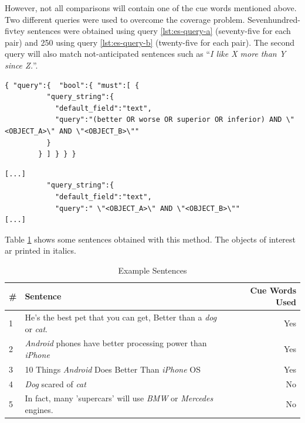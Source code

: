 However, not all comparisons will contain one of the cue words mentioned above. Two different queries were used to overcome the coverage problem. Sevenhundred-fivtey sentences were obtained using query \ref{lst:es-query-a} (seventy-five for each pair) and 250 using query \ref{lst:es-query-b} (twenty-five for each pair). The second query will also match not-anticipated sentences such as \enquote{\emph{I like X more than Y since Z.}}.



\begin{lstlisting}[label=lst:es-query-a,breaklines=true,postbreak=\mbox{\textcolor{red}{$\hookrightarrow$}\space},caption=Prestudy Sentence Selection Query A]
{ "query":{  "bool":{ "must":[ {
          "query_string":{
            "default_field":"text",
            "query":"(better OR worse OR superior OR inferior) AND \"<OBJECT_A>\" AND \"<OBJECT_B>\""
          }
        } ] } } }
\end{lstlisting}

\begin{lstlisting}[label=lst:es-query-b,breaklines=true,postbreak=\mbox{\textcolor{red}{$\hookrightarrow$}\space},caption=Prestudy Sentence Selection Query B (shortened)]
[...]
          "query_string":{
            "default_field":"text",
            "query":" \"<OBJECT_A>\" AND \"<OBJECT_B>\""
[...]
\end{lstlisting}

Table \ref{tbl:example_sentences} shows some sentences obtained with this method. The objects of interest ar printed in italics.

\begin{table}[h]
\centering
\caption{Example Sentences}
\label{tbl:example_sentences}
\begin{tabular}{@{}llr@{}}
\toprule
\# & Sentence   &  Cue Words Used                      \\ \midrule
1 & He's the best pet that you can get, Better than a \emph{dog} or \emph{cat}. & Yes \\
2 &\emph{Android} phones have better processing power than \emph{iPhone} & Yes \\
3 & 10 Things \emph{Android} Does Better Than \emph{iPhone} OS & Yes \\
4 & \emph{Dog} scared of \emph{cat} & No \\
5 & In fact, many 'supercars' will use \emph{BMW} or \emph{Mercedes} engines. & No \\

\bottomrule  
                               
\end{tabular}
\end{table}




